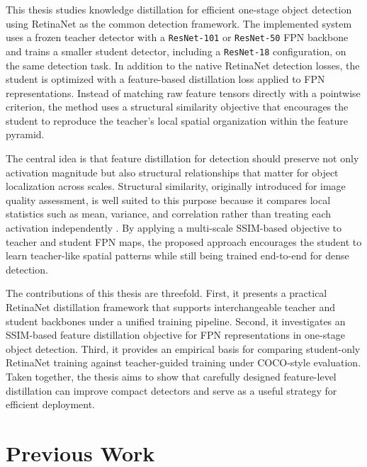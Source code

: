 \documentclass[12pt]{article}
\begin{document}
This thesis studies knowledge distillation for efficient one-stage object detection using RetinaNet as the common detection framework. The implemented system uses a frozen teacher detector with a \texttt{ResNet-101} or \texttt{ResNet-50} FPN backbone and trains a smaller student detector, including a \texttt{ResNet-18} configuration, on the same detection task. In addition to the native RetinaNet detection losses, the student is optimized with a feature-based distillation loss applied to FPN representations. Instead of matching raw feature tensors directly with a pointwise criterion, the method uses a structural similarity objective that encourages the student to reproduce the teacher's local spatial organization within the feature pyramid.

The central idea is that feature distillation for detection should preserve not only activation magnitude but also structural relationships that matter for object localization across scales. Structural similarity, originally introduced for image quality assessment, is well suited to this purpose because it compares local statistics such as mean, variance, and correlation rather than treating each activation independently \cite{wang2004ssim}. By applying a multi-scale SSIM-based objective to teacher and student FPN maps, the proposed approach encourages the student to learn teacher-like spatial patterns while still being trained end-to-end for dense detection.

The contributions of this thesis are threefold. First, it presents a practical RetinaNet distillation framework that supports interchangeable teacher and student backbones under a unified training pipeline. Second, it investigates an SSIM-based feature distillation objective for FPN representations in one-stage object detection. Third, it provides an empirical basis for comparing student-only RetinaNet training against teacher-guided training under COCO-style evaluation. Taken together, the thesis aims to show that carefully designed feature-level distillation can improve compact detectors and serve as a useful strategy for efficient deployment.

\section{Previous Work}
\end{document}
